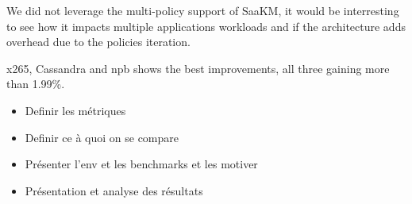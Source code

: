 \par We did not leverage the multi-policy support of SaaKM, it would be interresting to see how it impacts multiple applications workloads and if the architecture adds overhead due to the policies iteration. \newline

\par x265, Cassandra and npb shows the best improvements, all three gaining more than 1.99\%. 
\begin{itemize}
        \item Definir les métriques
        \item Definir ce à quoi on se compare
        \item Présenter l'env et les benchmarks et les motiver
        \item Présentation et analyse des résultats
\end{itemize}


